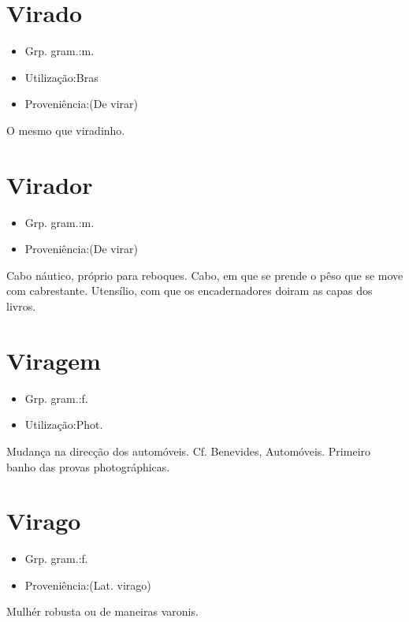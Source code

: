 \documentclass{article}
\begin{document}
\section{Virado}
\begin{itemize}
\item {Grp. gram.:m.}
\end{itemize}
\begin{itemize}
\item {Utilização:Bras}
\end{itemize}
\begin{itemize}
\item {Proveniência:(De \textunderscore virar\textunderscore )}
\end{itemize}
O mesmo que \textunderscore viradinho\textunderscore .
\section{Virador}
\begin{itemize}
\item {Grp. gram.:m.}
\end{itemize}
\begin{itemize}
\item {Proveniência:(De \textunderscore virar\textunderscore )}
\end{itemize}
Cabo náutico, próprio para reboques.
Cabo, em que se prende o pêso que se move com cabrestante.
Utensílio, com que os encadernadores doiram as capas dos livros.
\section{Viragem}
\begin{itemize}
\item {Grp. gram.:f.}
\end{itemize}
\begin{itemize}
\item {Utilização:Phot.}
\end{itemize}
Mudança na direcção dos automóveis. Cf. Benevides, \textunderscore Automóveis\textunderscore .
Primeiro banho das provas photográphicas.
\section{Virago}
\begin{itemize}
\item {Grp. gram.:f.}
\end{itemize}
\begin{itemize}
\item {Proveniência:(Lat. \textunderscore virago\textunderscore )}
\end{itemize}
Mulhér robusta ou de maneiras varonis.
\end{document}

